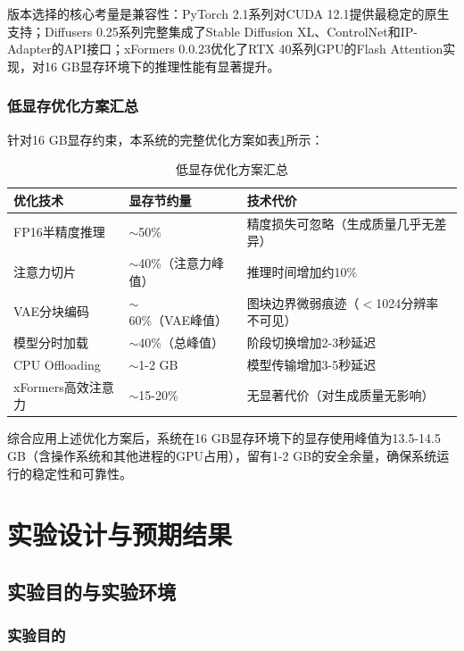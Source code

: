 \documentclass[12pt,a4paper]{ctexart}
\newcommand{\sdxl}{Stable Diffusion XL}
\newcommand{\controlnet}{ControlNet}
\newcommand{\ipadapter}{IP-Adapter}
\begin{document}
版本选择的核心考量是兼容性：PyTorch 2.1系列对CUDA 12.1提供最稳定的原生支持；Diffusers 0.25系列完整集成了\sdxl{}、\controlnet{}和\ipadapter{}的API接口；xFormers 0.0.23优化了RTX 40系列GPU的Flash Attention实现，对16 GB显存环境下的推理性能有显著提升。

\subsubsection{低显存优化方案汇总}

针对16 GB显存约束，本系统的完整优化方案如表\ref{tab:optimization}所示：

\begin{table}[H]
\centering
\caption{低显存优化方案汇总}
\label{tab:optimization}
\begin{tabular}{p{3.5cm} p{3.5cm} p{5cm}}
\toprule
\textbf{优化技术} & \textbf{显存节约量} & \textbf{技术代价} \\
\midrule
FP16半精度推理 & $\sim$50\% & 精度损失可忽略（生成质量几乎无差异） \\
注意力切片 & $\sim$40\%（注意力峰值） & 推理时间增加约10\% \\
VAE分块编码 & $\sim$60\%（VAE峰值） & 图块边界微弱痕迹（$<$1024分辨率不可见） \\
模型分时加载 & $\sim$40\%（总峰值） & 阶段切换增加2-3秒延迟 \\
CPU Offloading & $\sim$1-2 GB & 模型传输增加3-5秒延迟 \\
xFormers高效注意力 & $\sim$15-20\% & 无显著代价（对生成质量无影响） \\
\bottomrule
\end{tabular}
\end{table}

综合应用上述优化方案后，系统在16 GB显存环境下的显存使用峰值为13.5-14.5 GB（含操作系统和其他进程的GPU占用），留有1-2 GB的安全余量，确保系统运行的稳定性和可靠性。

\section{实验设计与预期结果}

\subsection{实验目的与实验环境}

\subsubsection{实验目的}
\end{document}
